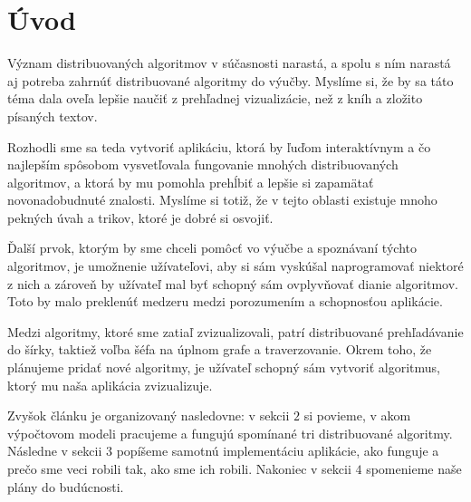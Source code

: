 \section{Úvod}

Význam distribuovaných algoritmov v súčasnosti narastá, a spolu s ním narastá aj potreba
zahrnúť distribuované algoritmy do výučby. Myslíme si, že by sa táto téma dala oveľa lepšie naučiť
z prehľadnej vizualizácie, než z kníh a zložito písaných textov.

Rozhodli sme sa teda vytvoriť aplikáciu, ktorá by ľuďom interaktívnym a čo najlepším spôsobom
vysvetľovala fungovanie mnohých distribuovaných algoritmov, a ktorá by mu pomohla prehĺbiť a lepšie si zapamätať
novonadobudnuté znalosti. Myslíme si totiž, že v tejto oblasti existuje mnoho pekných úvah a trikov,
ktoré je dobré si osvojiť. 

Ďalší prvok, ktorým by sme chceli pomôcť vo výučbe a spoznávaní týchto algoritmov, je umožnenie užívateľovi, 
aby si sám vyskúšal naprogramovať niektoré z nich a zároveň by užívateľ mal byť schopný sám
ovplyvňovať dianie algoritmov. Toto by malo preklenúť medzeru medzi porozumením a schopnosťou
aplikácie.

Medzi algoritmy, ktoré sme zatiaľ zvizualizovali, patrí distribuované prehľadávanie do šírky,
taktiež voľba šéfa na úplnom grafe a traverzovanie. Okrem toho, že plánujeme pridať nové 
algoritmy, je užívateľ schopný sám vytvoriť algoritmus, ktorý mu naša aplikácia zvizualizuje.

Zvyšok článku je organizovaný nasledovne: v sekcii $2$ si povieme, v akom výpočtovom modeli
pracujeme a fungujú spomínané tri distribuované algoritmy. 
Následne v sekcii $3$ popíšeme samotnú implementáciu aplikácie, ako
funguje a prečo sme veci robili tak, ako sme ich robili. Nakoniec v sekcii $4$ spomenieme naše plány do budúcnosti.
